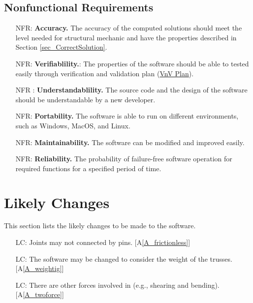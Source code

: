 \documentclass[12pt]{article}
\newcommand{\aref}[1]{A\ref{#1}}
\newcounter{reqnum} %
\newcounter{nonreqnum} %
\newcounter{lcnum} %
\begin{document}
\subsection{Nonfunctional Requirements}

\noindent 

\begin{itemize}
\item [NFR\refstepcounter{nonreqnum}\thenonreqnum \label{NFR_Accuracy}:] 
\textbf{Accuracy.} The accuracy of the computed solutions should meet the level 
needed 
for structural mechanic and have the properties described in Section 
\ref{sec_CorrectSolution}.
\item [NFR\refstepcounter{nonreqnum}\thenonreqnum \label{NFR_Verifiability}:]
\textbf{Verifiablility.}: The properties of the software should be able to 
tested easily through verification and validation plan 
(\href{https://github.com/tingyuw/cas741/blob/master/docs/VnVPlan/VnVPlan.pdf}{VnV
 Plan}). 
\item [NFR\refstepcounter{nonreqnum}\thenonreqnum 
\label{NFR_Understandability}:]
\textbf{Understandablility.} The source code and the design of the software 
should be understandable by a new developer.
\item [NFR\refstepcounter{nonreqnum}\thenonreqnum \label{NFR_Portability}:] 
\textbf{Portability.} The software is able to run on different environments, 
such as Windows, MacOS, and Linux.
\item [NFR\refstepcounter{nonreqnum}\thenonreqnum \label{NFR_Maintainability}:]
\textbf{Maintainability.} The software can be modified and improved easily.
\item [NFR\refstepcounter{nonreqnum}\thenonreqnum \label{NFR_Reliability}:]  
\textbf{Reliability.} The probability of failure-free software operation 
for required functions for a specified period of time.

\end{itemize}

\section{Likely Changes}    
This section lists the likely changes to be made to the software.
\noindent \begin{itemize}

\item[LC\refstepcounter{lcnum}\thelcnum\label{LC_notpinconnect}:] Joints may 
not connected by pins. [\aref{A_frictionless}]

\item[LC\refstepcounter{lcnum}\thelcnum\label{LC_weightinclude}:] The 
software may be changed to consider the weight of the trusses.
[\aref{A_weightig}]

\item[LC\refstepcounter{lcnum}\thelcnum\label{LC_otherforce}:] There are other 
forces involved in (e.g., shearing and bending). [\aref{A_twoforce}]

\end{itemize}
\end{document}
